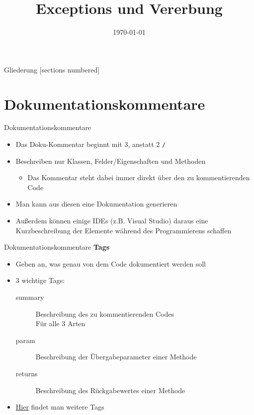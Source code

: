 



\title{Exceptions und Vererbung}
\date{\today}




\maketitle

\begin{frame}{Gliederung}
	[sections numbered]
	\tableofcontents
\end{frame}

\section{Dokumentationskommentare}
\begin{frame}{Dokumentationskommentare}
	\begin{itemize}
		\item Das Doku-Kommentar beginnt mit 3, anstatt 2 \texttt{\alert{/}}
		\item Beschreiben nur Klassen, Felder/Eigenschaften und Methoden
		\begin{itemize}
			\item Das Kommentar steht dabei immer direkt über den zu kommentierenden Code
		\end{itemize}
		\item Man kann aus diesen eine Dokumentation generieren
		\item Außerdem können einige IDEs (z.B. Visual Studio) daraus eine Kurzbeschreibung der Elemente während des Programmierens schaffen		
	\end{itemize}
\end{frame}

\begin{frame}{Dokumentationskommentare}
	\textbf{Tags}
	\begin{itemize}
		\item Geben an, was genau von dem Code dokumentiert werden soll
		\item 3 wichtige Tags:
		\begin{description}
			\item[summary] Beschreibung des zu kommentierenden Codes\\ Für alle 3 Arten
			\item[param] Beschreibung der Übergabeparameter einer Methode
			\item[returns] Beschreibung des Rückgabewertes einer Methode
		\end{description}
		\item \href{https://msdn.microsoft.com/de-de/library/5ast78ax.aspx}{\alert{Hier}} findet man weitere Tags
	\end{itemize}
\end{frame}

